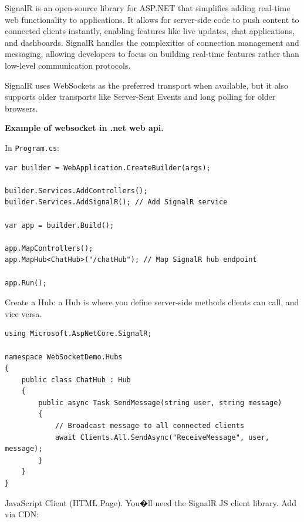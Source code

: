 SignalR is an open-source library for ASP.NET that simplifies adding real-time web functionality to applications. It allows for server-side code to push content to connected clients instantly, enabling features like live updates, chat applications, and dashboards. SignalR handles the complexities of connection management and messaging, allowing developers to focus on building real-time features rather than low-level communication protocols.

SignalR uses WebSockets as the preferred transport when available, but it also supports older transports like Server-Sent Events and long polling for older browsers.

\medskip

\textbf{Example of websocket in .net web api.}

In \verb"Program.cs":

\begin{lstlisting}
var builder = WebApplication.CreateBuilder(args);

builder.Services.AddControllers();
builder.Services.AddSignalR(); // Add SignalR service

var app = builder.Build();

app.MapControllers();
app.MapHub<ChatHub>("/chatHub"); // Map SignalR hub endpoint

app.Run();
\end{lstlisting}

Create a Hub: a Hub is where you define server-side methods clients can call, and vice versa.

\begin{lstlisting}
using Microsoft.AspNetCore.SignalR;

namespace WebSocketDemo.Hubs
{
    public class ChatHub : Hub
    {
        public async Task SendMessage(string user, string message)
        {
            // Broadcast message to all connected clients
            await Clients.All.SendAsync("ReceiveMessage", user, message);
        }
    }
}
\end{lstlisting}

JavaScript Client (HTML Page). You�ll need the SignalR JS client library. Add via CDN:



